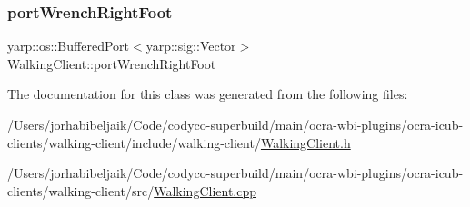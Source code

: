 \hypertarget{classWalkingClient_a96321dc60e84c193f2dea6e85983ca67}{}\label{classWalkingClient_a96321dc60e84c193f2dea6e85983ca67} 
\subsubsection{\texorpdfstring{port\+Wrench\+Right\+Foot}{portWrenchRightFoot}}
{\footnotesize\ttfamily yarp\+::os\+::\+Buffered\+Port$<$yarp\+::sig\+::\+Vector$>$ Walking\+Client\+::port\+Wrench\+Right\+Foot}



The documentation for this class was generated from the following files\+:\begin{DoxyCompactItemize}
\item 
/\+Users/jorhabibeljaik/\+Code/codyco-\/superbuild/main/ocra-\/wbi-\/plugins/ocra-\/icub-\/clients/walking-\/client/include/walking-\/client/\hyperlink{WalkingClient_8h}{Walking\+Client.\+h}\item 
/\+Users/jorhabibeljaik/\+Code/codyco-\/superbuild/main/ocra-\/wbi-\/plugins/ocra-\/icub-\/clients/walking-\/client/src/\hyperlink{WalkingClient_8cpp}{Walking\+Client.\+cpp}\end{DoxyCompactItemize}
